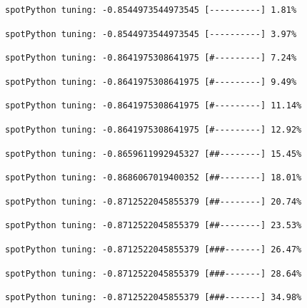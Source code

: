 \documentclass[
  letterpaper,
  DIV=11,
  numbers=noendperiod]{scrreprt}
\begin{document}
\begin{verbatim}
spotPython tuning: -0.8544973544973545 [----------] 1.81% 
\end{verbatim}

\begin{verbatim}
spotPython tuning: -0.8544973544973545 [----------] 3.97% 
\end{verbatim}

\begin{verbatim}
spotPython tuning: -0.8641975308641975 [#---------] 7.24% 
\end{verbatim}

\begin{verbatim}
spotPython tuning: -0.8641975308641975 [#---------] 9.49% 
\end{verbatim}

\begin{verbatim}
spotPython tuning: -0.8641975308641975 [#---------] 11.14% 
\end{verbatim}

\begin{verbatim}
spotPython tuning: -0.8641975308641975 [#---------] 12.92% 
\end{verbatim}

\begin{verbatim}
spotPython tuning: -0.8659611992945327 [##--------] 15.45% 
\end{verbatim}

\begin{verbatim}
spotPython tuning: -0.8686067019400352 [##--------] 18.01% 
\end{verbatim}

\begin{verbatim}
spotPython tuning: -0.8712522045855379 [##--------] 20.74% 
\end{verbatim}

\begin{verbatim}
spotPython tuning: -0.8712522045855379 [##--------] 23.53% 
\end{verbatim}

\begin{verbatim}
spotPython tuning: -0.8712522045855379 [###-------] 26.47% 
\end{verbatim}

\begin{verbatim}
spotPython tuning: -0.8712522045855379 [###-------] 28.64% 
\end{verbatim}

\begin{verbatim}
spotPython tuning: -0.8712522045855379 [###-------] 34.98% 
\end{verbatim}
\end{document}
